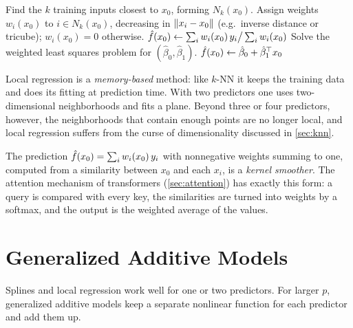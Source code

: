 \begin{algorithm}[H]
\caption{Local Regression}\label{alg:local-regression}
\begin{algorithmic}[1]
\Input{Training data $\{(x_i,y_i)\}_{i=1}^n$; span $s\in(0,1]$ (neighborhood of $k=\lceil sn\rceil$ points) or number of neighbors $k$; weight function; local degree $q\in\{0,1\}$; target point $x_0$.}
\State Find the $k$ training inputs closest to $x_0$, forming $N_k(x_0)$.
\State Assign weights $w_i(x_0)$ to $i\in N_k(x_0)$, decreasing in $\lVert x_i-x_0\rVert$ (e.g.\ inverse distance or tricube); $w_i(x_0)=0$ otherwise.
  \State $\hat f(x_0)\gets\sum_iw_i(x_0)\,y_i\big/\sum_iw_i(x_0)$ 
\Else
  \State Solve the weighted least squares problem for $(\hat\beta_0,\hat\beta_1)$.
  \State $\hat f(x_0)\gets\hat\beta_0+\hat\beta_1^{\top} x_0$ 
\EndIf
{}
\end{algorithmic}
\end{algorithm}

Local regression is a \emph{memory-based} method: like $k$-NN it keeps the training data and does its fitting at prediction time. With two predictors one uses two-dimensional neighborhoods and fits a plane. Beyond three or four predictors, however, the neighborhoods that contain enough points are no longer local, and local regression suffers from the curse of dimensionality discussed in \cref{sec:knn}.

\begin{remark}\label{rem:local-attention}
The prediction $\hat f(x_0)=\sum_iw_i(x_0)\,y_i$ with nonnegative weights summing to one, computed from a similarity between $x_0$ and each $x_i$, is a \emph{kernel smoother}. The attention mechanism of transformers (\cref{sec:attention}) has exactly this form: a query is compared with every key, the similarities are turned into weights by a softmax, and the output is the weighted average of the values.
\end{remark}

\section{Generalized Additive Models}\label{sec:gam}

Splines and local regression work well for one or two predictors. For larger $p$, generalized additive models keep a separate nonlinear function for each predictor and add them up.

